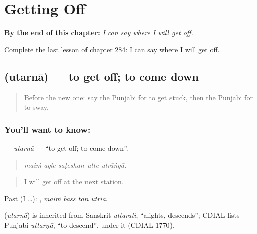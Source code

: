 
\chapter{Getting Off}
\label{ch:pa-a2-getting-off}

\begin{chapteropening}
\textbf{By the end of this chapter:} \emph{I can say where I will get off.}

Complete the last lesson of chapter 284: I can say where I will get off.
\end{chapteropening}

\section[\texorpdfstring{\pa{ਉਤਰਨਾ} (utarnā)}{ਉਤਰਨਾ (utarnā)}]{ (utarnā) — to get off; to come down}

\label{lesson:PA-C284-utarna}



\begin{quote}
Before the new one: say the Punjabi for to get stuck, then the Punjabi for to sway.
\end{quote}

\subsection*{You'll want to know: }
\textbf{} — \emph{utarnā} — \textquotedblleft{}to get off; to come down\textquotedblright{}.

\begin{quote}
    
\end{quote}

\begin{quote}
\emph{maiṁ agle saṭeshan utte utrāṅgā.}
\end{quote}

\begin{quote}
I will get off at the next station.
\end{quote}

Past (I …):    , \emph{maiṁ bass ton utriā}.

\begin{cousinweb}
\textbf{} (\emph{utarnā}) is inherited from Sanskrit \emph{uttarati}, \textquotedblleft{}alights, descends\textquotedblright{}; CDIAL lists Punjabi \emph{uttarṇā}, \textquotedblleft{}to descend\textquotedblright{}, under it (CDIAL 1770).
\end{cousinweb}

